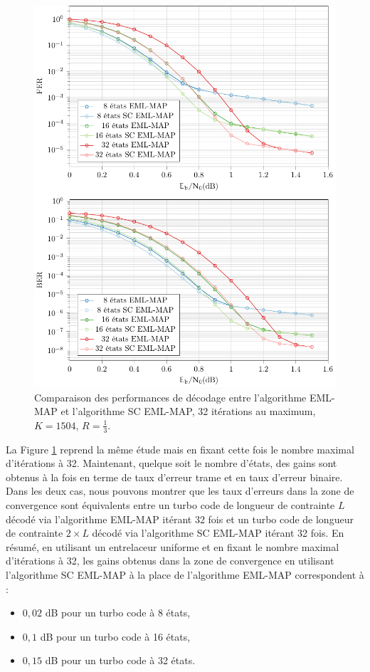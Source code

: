 \begin{figure}[!t]
	\centering
	\includegraphics[width=.9\textwidth]{main/ch2_fig/tikz/sc_32it.pdf}
	\caption{Comparaison des performances de décodage entre l'algorithme EML-MAP et l'algorithme SC EML-MAP, 32 itérations au maximum, $K=1504$, $R=\frac{1}{3}$.\label{fig:sc32it}}
\end{figure}

La Figure \ref{fig:sc32it} reprend la même étude mais en fixant cette fois le nombre maximal d'itérations à 32. Maintenant,
quelque soit le nombre d'états, des gains sont obtenus à la fois en terme de taux d'erreur trame et en taux d'erreur binaire.\\
Dans les deux cas, nous pouvons montrer que les taux d'erreurs dans la zone de convergence sont équivalents entre un turbo code de  
longueur de contrainte $L$ décodé via l'algorithme EML-MAP itérant 32 fois et un turbo code de longueur de contrainte 
$2\times L$ décodé via l'algorithme SC EML-MAP itérant 32 fois. En résumé, en utilisant un entrelaceur uniforme et en 
fixant le nombre maximal d'itérations à 32, les gains obtenus dans la zone de convergence en utilisant l'algorithme SC 
EML-MAP à la place de l'algorithme EML-MAP correspondent à :
\begin{itemize}
	\item $0,02$ dB pour un turbo code à 8 états,
	\item $0,1$ dB pour un turbo code à 16 états,
	\item $0,15$ dB pour un turbo code à 32 états. \\
\end{itemize}

